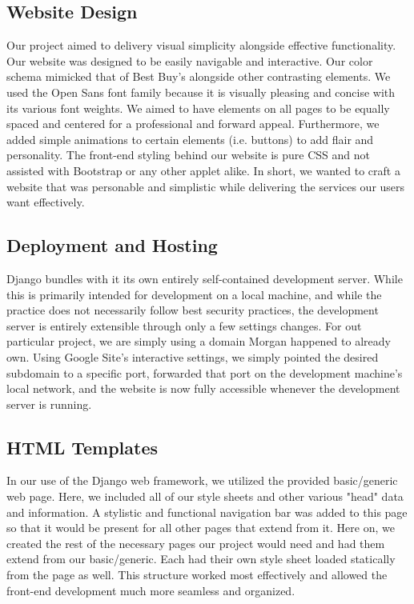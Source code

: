 \documentclass[sigconf]{acmart}
\begin{document}
\subsection{Website Design}\label{website}
Our project aimed to delivery visual simplicity alongside effective functionality. Our website was designed to be easily navigable and interactive. Our color schema mimicked that of Best Buy's alongside other contrasting elements. We used the Open Sans font family because it is visually pleasing and concise with its various font weights. We aimed to have elements on all pages to be equally spaced and centered for a professional and forward appeal. Furthermore, we added simple animations to certain elements (i.e. buttons) to add flair and personality. The front-end styling behind our website is pure CSS and not assisted with Bootstrap or any other applet alike. In short, we wanted to craft a website that was personable and simplistic while delivering the services our users want effectively.

\subsection{Deployment and Hosting}\label{hosting}
Django bundles with it its own entirely self-contained development server. While this is primarily intended for development on a local machine, and while the practice does not necessarily follow best security practices, the development server is entirely extensible through only a few settings changes. For out particular project, we are simply using a domain Morgan happened to already own. Using Google Site's interactive settings, we simply pointed the desired subdomain to a specific port, forwarded that port on the development machine's local network, and the website is now fully accessible whenever the development server is running.

\subsection{HTML Templates}\label{templates}
In our use of the Django web framework, we utilized the provided basic/generic web page. Here, we included all of our style sheets and other various "head" data and information. A stylistic and functional navigation bar was added to this page so that it would be present for all other pages that extend from it. Here on, we created the rest of the necessary pages our project would need and had them extend from our basic/generic. Each had their own style sheet loaded statically from the page as well. This structure worked most effectively and allowed the front-end development much more seamless and organized.
\end{document}
